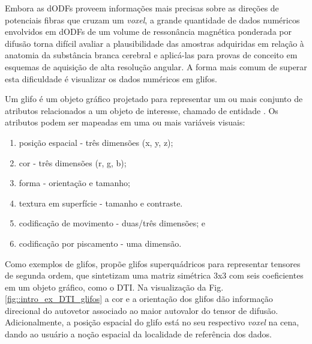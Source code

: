 \documentclass[
    12pt,                %
    oneside,            %
    a4paper,            %
    english,            %
    french,                %
    spanish,            %
    brazil                %
    ]{abntex2}
\begin{document}
Embora as dODFs proveem informações mais precisas sobre as direções de potenciais fibras que cruzam um \textit{voxel}, a grande quantidade de dados numéricos envolvidos em dODFs de um volume de ressonância magnética ponderada por difusão torna difícil avaliar a plausibilidade das amostras adquiridas em relação à anatomia da substância branca cerebral e aplicá-las para provas de conceito em esquemas de aquisição de alta resolução angular. A forma mais comum de superar esta dificuldade é visualizar os dados numéricos em glifos. 


Um glifo é um objeto gráfico projetado para representar um ou mais conjunto de atributos relacionados a um objeto de interesse, chamado de entidade \cite{ware2004}. Os atributos podem ser mapeadas em uma ou mais variáveis visuais:

\begin{enumerate}
    \item posição espacial -  três dimensões (x, y, z);
    \item cor - três dimensões (r, g, b);
    \item forma - orientação e tamanho;
    \item textura em superfície - tamanho e contraste.
    \item codificação de movimento - duas/três dimensões; e
    \item codificação por piscamento - uma dimensão.
\end{enumerate}

Como exemplos de glifos,  propõe glifos superquádricos para representar tensores de segunda ordem, que sintetizam uma matriz simétrica 3x3 com seis coeficientes em um objeto gráfico, como o DTI. Na visualização da Fig. \ref{fig::intro_ex_DTI_glifos} a cor e a orientação dos glifos dão informação direcional do autovetor associado ao maior autovalor do tensor de difusão. Adicionalmente, a posição espacial do glifo está no seu respectivo \textit{voxel} na cena, dando ao usuário a noção espacial da localidade de referência dos dados.
\end{document}
